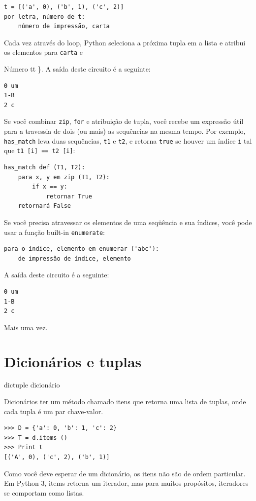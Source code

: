 \documentclass[10pt]{book}
\begin{document}
\begin{exercise}
\begin{v erbatim}
\begin{verbatim}
t = [('a', 0), ('b', 1), ('c', 2)]
por letra, número de t:
    número de impressão, carta
\end{verbatim}
%
Cada vez através do loop, Python seleciona a próxima tupla em
a lista e atribui os elementos para {\tt carta} e 
{Número tt \}. A saída deste circuito é a seguinte:

\begin{verbatim}
0 um
1-B
2 c
\end{verbatim}
%
Se você combinar {\tt zip}, {\tt for} e atribuição de tupla, você recebe um
expressão útil para a travessia de dois (ou mais) as sequências na mesma
tempo. Por exemplo, \verb "has_match" leva duas sequências, {\tt t1} e
{\tt t2}, e retorna {\tt true} se houver um índice {\tt i}
tal que {\tt t1 [i] == t2 [i]}:

\begin{verbatim}
has_match def (T1, T2):
    para x, y em zip (T1, T2):
        if x == y:
            retornar True
    retornará False
\end{verbatim}
%
Se você precisa atravessar os elementos de uma seqüência e sua
índices, você pode usar a função built-in {\tt enumerate}:

\begin{verbatim}
para o índice, elemento em enumerar ('abc'):
    de impressão de índice, elemento
\end{verbatim}
%
A saída deste circuito é a seguinte:

\begin{verbatim}
0 um
1-B
2 c
\end{verbatim}
%
Mais uma vez.


\section{Dicionários e tuplas}
\label{} dictuple
\index{} dicionário

Dicionários ter um método chamado {itens \tt} que retorna uma lista de
tuplas, onde cada tupla é um par chave-valor.

\begin{verbatim}
>>> D = {'a': 0, 'b': 1, 'c': 2}
>>> T = d.items ()
>>> Print t
[('A', 0), ('c', 2), ('b', 1)]
\end{verbatim}
%
Como você deve esperar de um dicionário, os itens não são de
ordem particular. Em Python 3, {items \tt} retorna um iterador,
mas para muitos propósitos, iteradores se comportam como listas.

}
\end{v erbatim}
\end{exercise}
\end{document}
